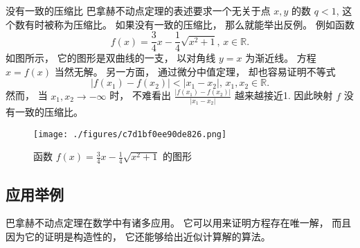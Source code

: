 \begin{example}{没有一致的压缩比}
巴拿赫不动点定理的表述要求一个无关于点 $x,y$ 的数 $q<1$, 这个数有时被称为压缩比。 如果没有一致的压缩比， 那么就能举出反例。 例如函数
$$
f(x)=\frac{3}{4}x-\frac{1}{4}\sqrt{x^2+1},\,x\in\mathbb{R}.
$$
如图所示， 它的图形是双曲线的一支， 以对角线 $y=x$ 为渐近线。 方程 $x=f(x)$ 当然无解。 另一方面， 通过微分中值定理， 却也容易证明不等式
$$
|f(x_1)-f(x_2)|<|x_1-x_2|,\,x_1,x_2\in\mathbb{R}.
$$
然而， 当 $x_1,x_2\to-\infty$ 时， 不难看出 $\frac{|f(x_1)-f(x_2)|}{|x_1-x_2|}$ 越来越接近1. 因此映射 $f$ 没有一致的压缩比。 
\begin{figure}[ht]
\centering
\texttt{[image: ./figures/c7d1bf0ee90de826.png]}
\caption{函数 $f(x)=\frac{3}{4}x-\frac{1}{4}\sqrt{x^2+1}$ 的图形} \label{fig_ConMap_2}
\end{figure}

\end{example}

\subsection{应用举例}
巴拿赫不动点定理在数学中有诸多应用。 它可以用来证明方程存在唯一解， 而且因为它的证明是构造性的， 它还能够给出近似计算解的算法。


